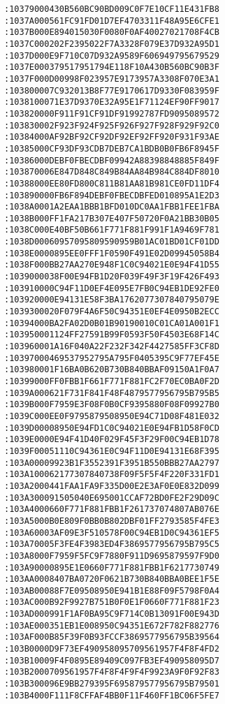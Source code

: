 \begin{lstlisting}[language={}, basicstyle=\scriptsize, caption=Машинний код]
:10379000430B560BC90BD009C0F7E10CF11E431FB8
:1037A000561FC91FD01D7EF4703311F48A95E6CFE1
:1037B000E894015030F0080F0AF40027021708F4CB
:1037C000202F2395022F7A3328F079E37D932A95D1
:1037D000E9F710C07D932A9589F606949795679529
:1037E000379517951794E118F10A430B560BC90B3F
:1037F000D00998F023957E9173957A3308F070E3A1
:103800007C932013B8F77E9170617D9330F083959F
:1038100071E37D9370E32A95E1F71124EF90FF9017
:103820000F911F91CF91DF91992787FD9095089572
:103830002F923F924F925F926F927F928F929F92C0
:10384000AF92BF92CF92DF92EF92FF920F931F93AE
:10385000CF93DF93CDB7DEB7CA1BDB0B0FB6F8945F
:10386000DEBF0FBECDBF09942A88398848885F849F
:103870006E847D848C849B84AA84B984C884DF8010
:10388000EE80FD800C811B81AA81B981CE0FD11DF4
:103890000FB6F894DEBF0FBECDBFED010895A1E2D3
:1038A0001A2EAA1BBB1BFD010DC0AA1FBB1FEE1FBA
:1038B000FF1FA217B307E407F50720F0A21BB30B05
:1038C000E40BF50B661F771F881F991F1A9469F781
:1038D00060957095809590959B01AC01BD01CF01DD
:1038E0000895EE0FFF1F0590F491E02D09945058B4
:1038F000BB27AA270E948F1C0C94021E0E94F41D55
:1039000038F00E94FB1D20F039F49F3F19F426F493
:103910000C94F11D0EF4E095E7FB0C94EB1DE92FE0
:103920000E94131E58F3BA1762077307840795079E
:1039300020F079F4A6F50C94351E0EF4E0950B2ECC
:10394000BA2FA02D0B01B90190010C01CA01A001F1
:103950001124FF27591B99F0593F50F4503E68F14C
:103960001A16F040A22F232F342F4427585FF3CF8D
:10397000469537952795A795F0405395C9F77EF45E
:103980001F16BA0B620B730B840BBAF09150A1F0A7
:10399000FF0FBB1F661F771F881FC2F70EC0BA0F2D
:1039A000621F731F841F48F4879577956795B795B5
:1039B000F7959E3F08F0B0CF9395880F08F09927B0
:1039C000EE0F9795879508950E94C71D08F481E032
:1039D00008950E94FD1C0C94021E0E94FB1D58F0CD
:1039E0000E94F41D40F029F45F3F29F00C94EB1D78
:1039F00051110C94361E0C94F11D0E94131E68F395
:103A00009923B1F3552391F3951B550BBB27AA2797
:103A100062177307840738F09F5F5F4F220F331FD1
:103A2000441FAA1FA9F335D00E2E3AF0E0E832D099
:103A300091505040E695001CCAF72BD0FE2F29D09C
:103A4000660F771F881FBB1F261737074807AB076E
:103A5000B0E809F0BB0B802DBF01FF2793585F4FE3
:103A60003AF09E3F510578F00C94EB1D0C94361EF5
:103A70005F3FE4F3983ED4F3869577956795B795C5
:103A8000F7959F5FC9F7880F911D9695879597F9D0
:103A90000895E1E0660F771F881FBB1F6217730749
:103AA0008407BA0720F0621B730B840BBA0BEE1F5E
:103AB00088F7E09508950E941B1E88F09F5798F0A4
:103AC000B92F9927B751B0F0E1F0660F771F881F23
:103AD000991F1AF0BA95C9F714C0B13091F00E943D
:103AE000351EB1E008950C94351E672F782F882776
:103AF000B85F39F0B93FCCF3869577956795B39564
:103B0000D9F73EF490958095709561957F4F8F4FD2
:103B10009F4F0895E89409C097FB3EF490958095D7
:103B2000709561957F4F8F4F9F4F9923A9F0F92F83
:103B300096E9BB279395F695879577956795B79501
:103B4000F111F8CFFAF4BB0F11F460FF1BC06F5FE7

\end{lstlisting}
